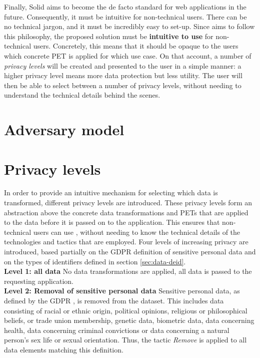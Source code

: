 Finally, Solid aims to become the de facto standard for web applications in the future. Consequently, it must be intuitive for non-technical users. There can be no technical jargon, and it must be incredibly easy to set-up. Since \middleware{} aims to follow this philosophy, the proposed solution must be \textbf{intuitive to use} for non-technical users. Concretely, this means that it should be opaque to the users which concrete PET is applied for which use case. On that account, a number of \textit{privacy levels} will be created and presented to the user in a simple manner: a higher privacy level means more data protection but less utility. The user will then be able to select between a number of privacy levels, without needing to understand the technical details behind the scenes.

\section{Adversary model}

\section{Privacy levels}
In order to provide an intuitive mechanism for selecting which data is transformed, different privacy levels are introduced. These privacy levels form an abstraction above the concrete data transformations and \gls{PETs} that are applied to the data before it is passed on to the application. This ensures that non-technical users can use \middleware{}, without needing to know the technical details of the technologies and tactics that are employed. Four levels of increasing privacy are introduced, based partially on the \gls{GDPR} definition of sensitive personal data and on the types of identifiers defined in section \ref{sec:data-deid}.\\

\noindent \textbf{Level 1: all data} No data transformations are applied, all data is passed to the requesting application.\\

\noindent \textbf{Level 2: Removal of sensitive personal data} Sensitive personal data, as defined by the GDPR \citep{gdpr}, is removed from the dataset. This includes data consisting of racial or ethnic origin, political opinions, religious or philosophical beliefs, or trade union membership, genetic data, biometric data, data concerning health, data concerning criminal convictions or data concerning a natural person's sex life or sexual orientation. Thus, the tactic \textit{Remove} is applied to all data elements matching this definition.\\

